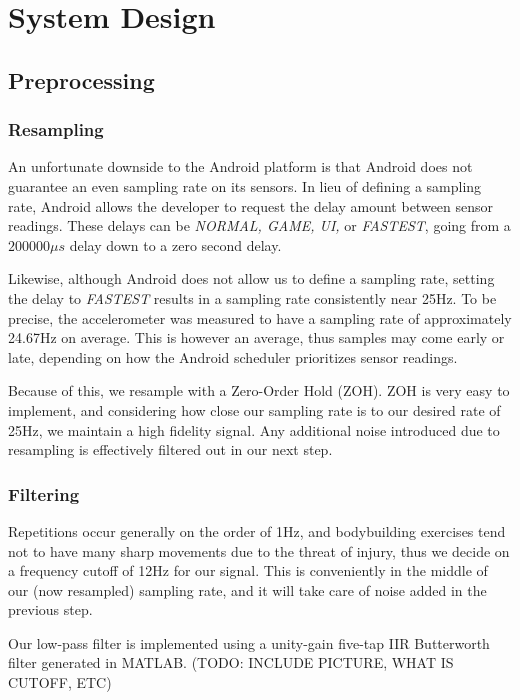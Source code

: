 \chapter{System Design}

\section{Preprocessing}

\subsection{Resampling}
An unfortunate downside to the Android platform is that Android does not guarantee an even sampling rate on its sensors. In lieu of defining a sampling rate, Android allows the developer to request the delay amount between sensor readings. These delays can be \textit{NORMAL, GAME, UI,} or \textit{FASTEST}, going from a $200000\mu s$ delay down to a zero second delay.

Likewise, although Android does not allow us to define a sampling rate, setting the delay to \textit{FASTEST} results in a sampling rate consistently near 25Hz. To be precise, the accelerometer was measured to have a sampling rate of approximately 24.67Hz on average. This is however an average, thus samples may come early or late, depending on how the Android scheduler prioritizes sensor readings. 

Because of this, we resample with a Zero-Order Hold (ZOH). ZOH is very easy to implement, and considering how close our sampling rate is to our desired rate of 25Hz, we maintain a high fidelity signal. Any additional noise introduced due to resampling is effectively filtered out in our next step.

\subsection{Filtering}
Repetitions occur generally on the order of 1Hz, and bodybuilding exercises tend not to have many sharp movements due to the threat of injury, thus we decide on a frequency cutoff of 12Hz for our signal. This is conveniently in the middle of our (now resampled) sampling rate, and it will take care of noise added in the previous step.

Our low-pass filter is implemented using a unity-gain five-tap IIR Butterworth filter generated in MATLAB. (TODO: INCLUDE PICTURE, WHAT IS CUTOFF, ETC)


